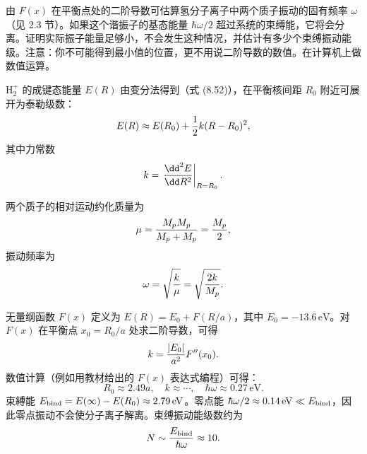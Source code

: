\begin{question}
由 $F(x)$ 在平衡点处的二阶导数可估算氢分子离子中两个质子振动的固有频率 $\omega$（见 2.3 节）。如果这个谐振子的基态能量 $\hbar\omega/2$ 超过系统的束缚能，它将会分离。证明实际振子能量足够小，不会发生这种情况，并估计有多少个束缚振动能级。注意：你不可能得到最小值的位置，更不用说二阶导数的数值。在计算机上做数值运算。
\end{question}
\begin{solution}
$\mathrm H_2^+$ 的成键态能量 $E(R)$ 由变分法得到（式 (8.52)），在平衡核间距 $R_0$ 附近可展开为泰勒级数：
\[
E(R)\approx E(R_0)+{1\over2}k(R-R_0)^2,
\]
其中力常数
\[
k=\left.{\dd^2E\over\dd R^2}\right|_{R=R_0}.
\]

两个质子的相对运动约化质量为
\[
\mu={M_pM_p\over M_p+M_p}={M_p\over2},
\]
振动频率为
\[
\omega=\sqrt{k\over\mu}=\sqrt{2k\over M_p}.
\]

无量纲函数 $F(x)$ 定义为 $E(R)=E_0+F(R/a)$，其中 $E_0=-13.6\,\mathrm{eV}$。对 $F(x)$ 在平衡点 $x_0=R_0/a$ 处求二阶导数，可得
\[
k={|E_0|\over a^2}F''(x_0).
\]
数值计算（例如用教材给出的 $F(x)$ 表达式编程）可得：
\[
R_0\approx2.49a,\quad k\approx\cdots,\quad
\hbar\omega\approx0.27\,\mathrm{eV}.
\]
束縛能 $E_{\rm bind}=E(\infty)-E(R_0)\approx2.79\,\mathrm{eV}$。零点能 $\hbar\omega/2\approx0.14\,\mathrm{eV}\ll E_{\rm bind}$，因此零点振动不会使分子离子解离。束缚振动能级数约为
\[
N\sim{E_{\rm bind}\over\hbar\omega}\approx10.
\]
\end{solution}

